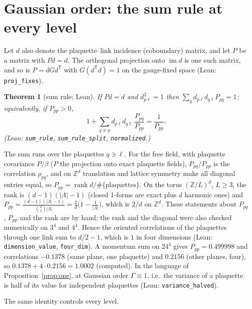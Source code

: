 \documentclass[11pt,a4paper]{article}
\newtheorem{theorem}{Theorem}[section]
\theoremstyle{definition}
\theoremstyle{remark}
\newcommand{\code}[1]{\texttt{#1}}
\begin{document}
\section{Gaussian order: the sum rule at every level}\label{sec:gauss}

Let $d$ also denote the plaquette--link incidence (coboundary) matrix, and let $P$ be a matrix with $Pd=d$. The orthogonal projection onto $\operatorname{im}d$ is one such matrix, and so is $P=dGd^{\mathsf T}$ with $G(d^{\mathsf T}d)=1$ on the gauge-fixed space (Lean: \code{proj\_fixes}).

\begin{theorem}[sum rule; Lean]\label{thm:sumrule}
If $Pd=d$ and $d_{p\ell}^2=1$ then $\sum_qd_{p\ell}d_{q\ell}P_{pq}=1$; equivalently, if $P_{pp}>0$,
\[
1+\sum_{q\ne p}d_{p\ell}d_{q\ell}\,\frac{P_{pq}}{P_{pp}}=\frac1{P_{pp}}.
\]
(Lean: \code{sum\_rule}, \code{sum\_rule\_split}, \code{normalized}.)
\end{theorem}

The sum runs over the plaquettes $q\ni\ell$. For the free field, with plaquette covariance $P/\beta$ ($P$ the projection onto exact plaquette fields), $P_{pq}/P_{pp}$ is the correlation $\rho_{pq}$, and on $\mathbb Z^d$ translation and lattice symmetry make all diagonal entries equal, so $P_{pp}=\operatorname{rank}d/\#\{\text{plaquettes}\}$. On the torus $(\mathbb Z/L)^d$, $L\ge3$, the rank is $(d-1)(|\Lambda|-1)$ (closed 1-forms are exact plus $d$ harmonic ones) and $P_{pp}=\frac{(d-1)(|\Lambda|-1)}{\binom d2|\Lambda|}=\frac2d\bigl(1-\frac1{|\Lambda|}\bigr)$, which is $2/d$ on $\mathbb Z^d$. These statements about $P_{pq}$, $P_{pp}$ and the rank are by hand; the rank and the diagonal were also checked numerically on $3^4$ and $4^4$. Hence the oriented correlations of the plaquettes through one link sum to $d/2-1$, which is $1$ in four dimensions (Lean: \code{dimension\_value}, \code{four\_dim}). A momentum sum on $24^4$ gives $P_{pp}=0.499998$ and correlations $-0.1378$ (same plane, one plaquette) and $0.2156$ (other planes, four), so $0.1378+4\cdot0.2156=1.0002$ (computed). In the language of Proposition~\ref{prop:one}, at Gaussian order $\Gamma\equiv1$, i.e.\ the variance of a plaquette is half of its value for independent plaquettes (Lean: \code{variance\_halved}).

The same identity controls every level.
\end{document}
